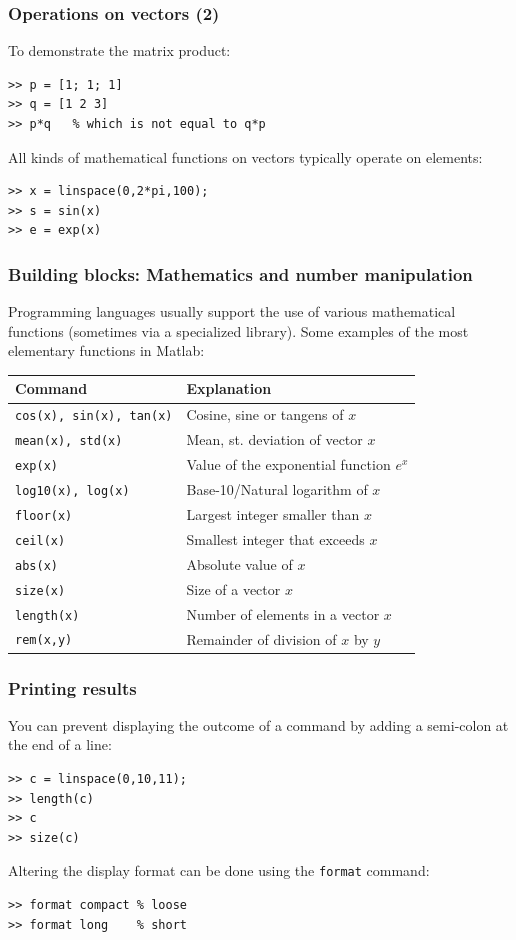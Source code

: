 \documentclass[11pt,table,final,fleqn,xcolor={usenames,dvipsnames},unknownkeysallowed,handout]{beamer}
\begin{document}
\begin{frame}[fragile]
  \frametitle{Operations on vectors (2)}
   To demonstrate the matrix product:
  \begin{lstlisting}
>> p = [1; 1; 1]
>> q = [1 2 3]
>> p*q   % which is not equal to q*p
  \end{lstlisting}\pause
  All kinds of mathematical functions on vectors typically operate on elements:
  \begin{lstlisting}
>> x = linspace(0,2*pi,100);
>> s = sin(x)
>> e = exp(x)
  \end{lstlisting}
\end{frame}

\begin{frame}
 \frametitle{Building blocks: Mathematics and number manipulation}
 Programming languages usually support the use of various mathematical functions (sometimes via a specialized library). Some examples of the most elementary functions in Matlab:
    \begin{longtable}{l!{\vrule}l}
      Command        & Explanation \\ \hline
      \texttt{cos(x), sin(x), tan(x)} & Cosine, sine or tangens of $x$ \\
      \texttt{mean(x), std(x)} & Mean, st. deviation of vector $x$ \\
      \texttt{exp(x)} & Value of the exponential function $e^x$ \\
      \texttt{log10(x), log(x)} & Base-10/Natural logarithm of $x$ \\
      \texttt{floor(x)} & Largest integer smaller than $x$ \\
      \texttt{ceil(x)} & Smallest integer that exceeds $x$ \\
      \texttt{abs(x)} & Absolute value of $x$ \\
      \texttt{size(x)} & Size of a vector $x$ \\
      \texttt{length(x)} & Number of elements in a vector $x$ \\
      \texttt{rem(x,y)} & Remainder of division of $x$ by $y$\\
    \end{longtable}
\end{frame}

\begin{frame}[fragile]
  \frametitle{Printing results}
  You can prevent displaying the outcome of a command by adding a semi-colon at the end of a line:
  \begin{lstlisting}
>> c = linspace(0,10,11);
>> length(c)
>> c
>> size(c)
  \end{lstlisting}\pause
  Altering the display format can be done using the \lstinline$format$ command:
  \begin{lstlisting}
>> format compact % loose
>> format long    % short
  \end{lstlisting}
\end{frame}
\end{document}
